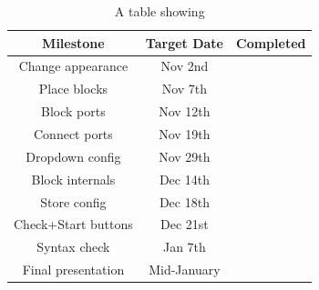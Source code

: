 \documentclass[journal,comsoc]{IEEEtran}
\begin{document}
\begin{table}[!ht]
\renewcommand{\arraystretch}{1.3}
\caption{A table showing}
\label{tab:milestones}
\centering
\begin{tabular}{|c|c|c|} \hline
		\textbf{Milestone} & \textbf{Target Date} & \textbf{Completed} \\ \hline
		Change appearance & Nov 2nd & \color{green}{In Time} \\ \hline
		Place blocks & Nov 7th & \color{green}{In Time} \\ \hline
		Block ports & Nov 12th & \color{green}{In Time} \\ \hline
		Connect ports & Nov 19th & \color{green}{In Time} \\ \hline
		Dropdown config & Nov 29th & \color{green}{In Time} \\ \hline
		Block internals & Dec 14th & \color{blue}{Early/Mid January} \\ \hline
		Store config & Dec 18th & \color{blue}{Early/Mid January} \\ \hline
		Check+Start buttons & Dec 21st & \color{blue}{Early/Mid January} \\ \hline
		Syntax check & Jan 7th & \color{blue}{Early/Mid January} \\ \hline
		Final presentation & Mid-January & \color{green}{Done} \\ \hline
\end{tabular}
\end{table}

\end{document}
